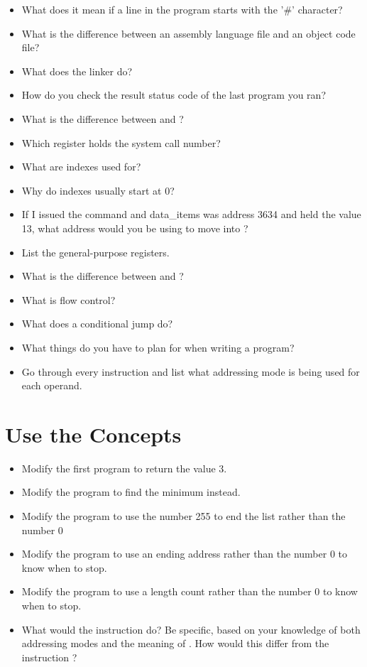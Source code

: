 \begin{itemize}\item What does it mean if a line in the program starts with the '\#' character? 
\item What is the difference between an assembly language file and an object code file? 
\item What does the linker do? 
\item How do you check the result status code of the last program you ran? 
\item What is the difference between  and ? 
\item Which register holds the system call number? 
\item What are indexes used for? 
\item Why do indexes usually start at 0? 
\item If I issued the command  and data\_items was address 3634 and {\ediReg} held the value 13, what address would you be using to move into {\eaxReg}? 
\item List the general-purpose registers. 
\item What is the difference between  and ? 
\item What is flow control? 
\item What does a conditional jump do? 
\item What things do you have to plan for when writing a program? 
\item Go through every instruction and list what addressing mode is being used for each operand. 
\end{itemize}

\section{Use the Concepts}

\begin{itemize}\item Modify the first program to return the value 3. 
\item Modify the  program to find the minimum instead. 
\item Modify the  program to use the number 255 to end the list rather than the number 0 
\item Modify the  program to use an ending address rather than the number 0 to know when to stop. 
\item Modify the  program to use a length count rather than the number 0 to know when to stop. 
\item What would the instruction  do?  Be specific, based on your knowledge of both addressing modes and the meaning of .  How would this differ from the instruction ? 
\end{itemize}

